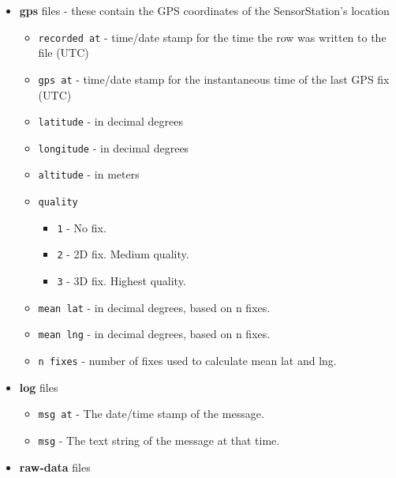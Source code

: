 \documentclass[
]{article}
\providecommand{\tightlist}{%
  \setlength{\itemsep}{0pt}\setlength{\parskip}{0pt}}
\begin{document}
\begin{itemize}
\tightlist
\item
  \textbf{gps} files - these contain the GPS coordinates of the
  SensorStation's location

  \begin{itemize}
  \tightlist
  \item
    \texttt{recorded\ at} - time/date stamp for the time the row was
    written to the file (UTC)
  \item
    \texttt{gps\ at} - time/date stamp for the instantaneous time of the
    last GPS fix (UTC)
  \item
    \texttt{latitude} - in decimal degrees
  \item
    \texttt{longitude} - in decimal degrees
  \item
    \texttt{altitude} - in meters
  \item
    \texttt{quality}

    \begin{itemize}
    \tightlist
    \item
      \texttt{1} - No fix.
    \item
      \texttt{2} - 2D fix. Medium quality.
    \item
      \texttt{3} - 3D fix. Highest quality.
    \end{itemize}
  \item
    \texttt{mean\ lat} - in decimal degrees, based on n fixes.
  \item
    \texttt{mean\ lng} - in decimal degrees, based on n fixes.
  \item
    \texttt{n\ fixes} - number of fixes used to calculate mean lat and
    lng.
  \end{itemize}
\item
  \textbf{log} files

  \begin{itemize}
  \tightlist
  \item
    \texttt{msg\ at} - The date/time stamp of the message.
  \item
    \texttt{msg} - The text string of the message at that time.
  \end{itemize}
\item
  \textbf{raw-data} files


\end{itemize}
\end{document}
